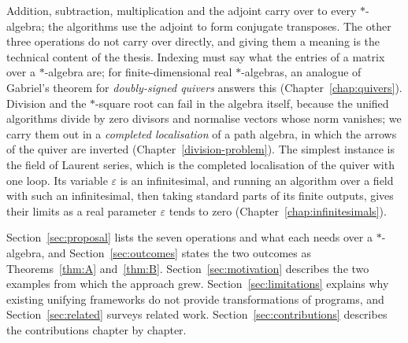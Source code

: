 \documentclass[12pt, a4paper]{report}
\theoremstyle{plain}
\theoremstyle{definition}
\theoremstyle{remark}
\theoremstyle{plain}
\newcommand{\staralg}[0]{$*$-algebra}
\newcommand{\staralgs}[0]{$*$-algebras}
\begin{document}
Addition, subtraction, multiplication and the adjoint carry over to every \staralg{}; the algorithms use the adjoint to form conjugate transposes. The other three operations do not carry over directly, and giving them a meaning is the technical content of the thesis. Indexing must say what the entries of a matrix over a \staralg{} are; for finite-dimensional real \staralgs{}, an analogue of Gabriel's theorem for \emph{doubly-signed quivers} answers this (Chapter~\ref{chap:quivers}). Division and the $*$-square root can fail in the algebra itself, because the unified algorithms divide by zero divisors and normalise vectors whose norm vanishes; we carry them out in a \emph{completed localisation} of a path algebra, in which the arrows of the quiver are inverted (Chapter~\ref{division-problem}). The simplest instance is the field of Laurent series, which is the completed localisation of the quiver with one loop. Its variable $\varepsilon$ is an infinitesimal, and running an algorithm over a field with such an infinitesimal, then taking standard parts of its finite outputs, gives their limits as a real parameter $\varepsilon$ tends to zero (Chapter~\ref{chap:infinitesimals}).

Section~\ref{sec:proposal} lists the seven operations and what each needs over a \staralg{}, and Section~\ref{sec:outcomes} states the two outcomes as Theorems~\ref{thm:A} and~\ref{thm:B}. Section~\ref{sec:motivation} describes the two examples from which the approach grew. Section~\ref{sec:limitations} explains why existing unifying frameworks do not provide transformations of programs, and Section~\ref{sec:related} surveys related work. Section~\ref{sec:contributions} describes the contributions chapter by chapter.
\end{document}
